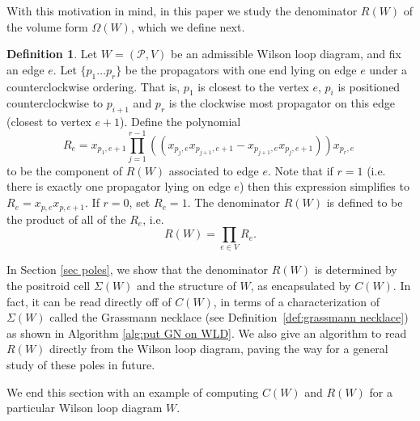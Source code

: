 \documentclass[11pt]{article}
\newcommand{\cP}{\mathcal{P}}
\theoremstyle{remark}
\theoremstyle{definition}
\newtheorem{dfn}[thm]{Definition}
\begin{document}
With this motivation in mind, in this paper we study the denominator $R(W)$ of the volume form $\Omega(W)$, which we define next.

\begin{dfn}\label{def R(W)}
Let $W = (\cP,V)$ be an admissible Wilson loop diagram, and fix an edge $e$. Let $\{p_1 \ldots p_r\}$ be the propagators with one end lying on edge $e$ under a counterclockwise ordering. That is, $p_1$ is closest to the vertex $e$, $p_i$ is positioned counterclockwise to $p_{i+1}$ and $p_r$ is the clockwise most propagator on this edge (closest to vertex $e+1$). Define the polynomial
\[ R_e =  x_{p_1,e+1} \prod_{j= 1}^{r-1} \left((x_{p_j,e} x_{p_{j+1},e+1} - x_{p_{j+1},e} x_{p_{j},e+1} ) \right) x_{p_r,e}\;\]
to be the component of $R(W)$ associated to edge $e$. Note that if $r = 1$ (i.e. there is exactly one propagator lying on edge $e$) then this expression simplifies to $R_e = x_{p,e} x_{p,e+1}$. If $r=0$, set $R_e = 1$. The denominator $R(W)$ is defined to be the product of all of the $R_e$, i.e. 
\[R(W) = \prod_{e \in V} R_e.\]
\end{dfn}

In Section \ref{sec poles}, we show that the denominator $R(W)$ is determined by the positroid cell $\Sigma(W)$ and the structure of $W$, as encapsulated by $C(W)$. In fact, it can be read directly off of $C(W)$, in terms of a characterization of $\Sigma(W)$ called the Grassmann necklace (see Definition~\ref{def:grassmann necklace}) as shown in Algorithm \ref{alg:put GN on WLD}. We also give an algorithm to read $R(W)$ directly from the Wilson loop diagram, paving the way for a general study of these poles in future. 

We end this section with an example of computing $C(W)$ and $R(W)$ for a particular Wilson loop diagram $W$.
\end{document}
